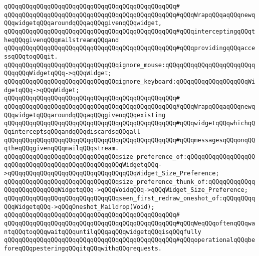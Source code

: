 \verb|qQQqqQQqqQQqqQQqqQQqqQQqqQQqqQQqqQQqqQQqqQQqqQQq#|\newline
\verb|qQQqqQQqqQQqqQQqqQQqqQQqqQQqqQQqqQQqqQQqqQQqqQQq#qQQqWrapqQQqaqQQqnewqQQqwidgetqQQqaroundqQQqaqQQqgivenqQQqwidget,|\newline
\verb|qQQqqQQqqQQqqQQqqQQqqQQqqQQqqQQqqQQqqQQqqQQqqQQq#qQQqinterceptingqQQqtheqQQqgivenqQQqmailstreamqQQqand|\newline
\verb|qQQqqQQqqQQqqQQqqQQqqQQqqQQqqQQqqQQqqQQqqQQqqQQq#qQQqprovidingqQQqaccessqQQqtoqQQqit.|\newline
\newline
\verb|qQQqqQQqqQQqqQQqqQQqqQQqqQQqqQQqignore_mouse:qQQqqQQqqQQqqQQqqQQqqQQqqQQqqQQqWidgetqQQq->qQQqWidget;|\newline
\verb|qQQqqQQqqQQqqQQqqQQqqQQqqQQqqQQqignore_keyboard:qQQqqQQqqQQqqQQqqQQqWidgetqQQq->qQQqWidget;|\newline
\verb|qQQqqQQqqQQqqQQqqQQqqQQqqQQqqQQqqQQqqQQqqQQqqQQq#|\newline
\verb|qQQqqQQqqQQqqQQqqQQqqQQqqQQqqQQqqQQqqQQqqQQqqQQq#qQQqWrapqQQqaqQQqnewqQQqwidgetqQQqaroundqQQqaqQQqgivenqQQqexisting|\newline
\verb|qQQqqQQqqQQqqQQqqQQqqQQqqQQqqQQqqQQqqQQqqQQqqQQq#qQQqwidgetqQQqwhichqQQqinterceptsqQQqandqQQqdiscardsqQQqall|\newline
\verb|qQQqqQQqqQQqqQQqqQQqqQQqqQQqqQQqqQQqqQQqqQQqqQQq#qQQqmessagesqQQqonqQQqtheqQQqgivenqQQqmailqQQqstream.|\newline
\newline
\verb|qQQqqQQqqQQqqQQqqQQqqQQqqQQqqQQqsize_preference_of:qQQqqQQqqQQqqQQqqQQqqQQqqQQqqQQqqQQqqQQqqQQqqQQqqQQqWidgetqQQq->qQQqqQQqqQQqqQQqqQQqqQQqqQQqqQQqqQQqWidget_Size_Preference;|\newline
\verb|qQQqqQQqqQQqqQQqqQQqqQQqqQQqqQQqsize_preference_thunk_of:qQQqqQQqqQQqqQQqqQQqqQQqqQQqWidgetqQQq->qQQqVoidqQQq->qQQqWidget_Size_Preference;|\newline
\newline
\verb|qQQqqQQqqQQqqQQqqQQqqQQqqQQqqQQqseen_first_redraw_oneshot_of:qQQqqQQqqQQqWidgetqQQq->qQQqOneshot_Maildrop(Void);|\newline
\verb|qQQqqQQqqQQqqQQqqQQqqQQqqQQqqQQqqQQqqQQqqQQqqQQq#|\newline
\verb|qQQqqQQqqQQqqQQqqQQqqQQqqQQqqQQqqQQqqQQqqQQqqQQq#qQQqWeqQQqoftenqQQqwantqQQqtoqQQqwaitqQQquntilqQQqaqQQqwidgetqQQqisqQQqfully|\newline
\verb|qQQqqQQqqQQqqQQqqQQqqQQqqQQqqQQqqQQqqQQqqQQqqQQq#qQQqoperationalqQQqbeforeqQQqpesteringqQQqitqQQqwithqQQqrequests.|\newline
